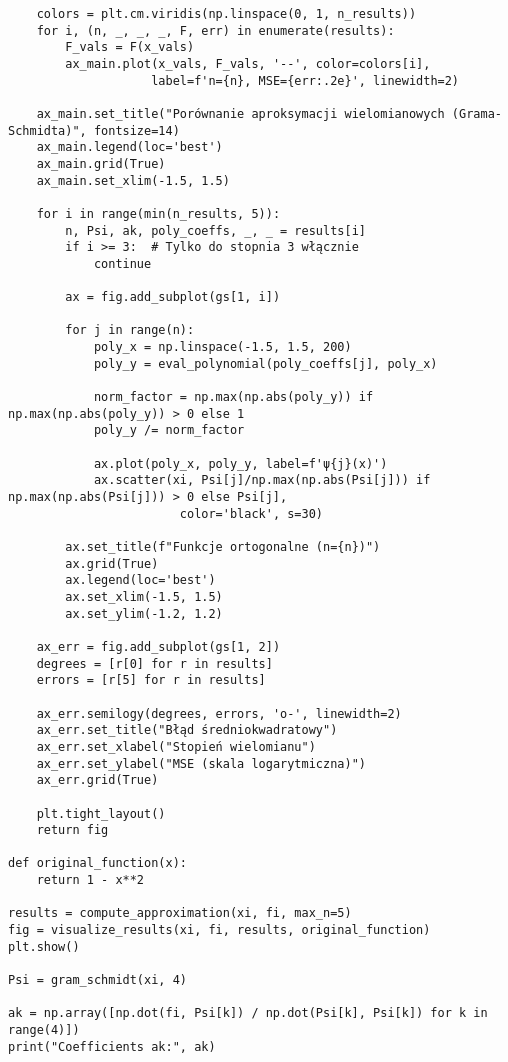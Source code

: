 \documentclass{article}
\begin{document}
\begin{verbatim}
    colors = plt.cm.viridis(np.linspace(0, 1, n_results))
    for i, (n, _, _, _, F, err) in enumerate(results):
        F_vals = F(x_vals)
        ax_main.plot(x_vals, F_vals, '--', color=colors[i], 
                    label=f'n={n}, MSE={err:.2e}', linewidth=2)
    
    ax_main.set_title("Porównanie aproksymacji wielomianowych (Grama-Schmidta)", fontsize=14)
    ax_main.legend(loc='best')
    ax_main.grid(True)
    ax_main.set_xlim(-1.5, 1.5)
    
    for i in range(min(n_results, 5)):
        n, Psi, ak, poly_coeffs, _, _ = results[i]
        if i >= 3:  # Tylko do stopnia 3 włącznie
            continue
            
        ax = fig.add_subplot(gs[1, i])
        
        for j in range(n):
            poly_x = np.linspace(-1.5, 1.5, 200)
            poly_y = eval_polynomial(poly_coeffs[j], poly_x)
            
            norm_factor = np.max(np.abs(poly_y)) if np.max(np.abs(poly_y)) > 0 else 1
            poly_y /= norm_factor
            
            ax.plot(poly_x, poly_y, label=f'ψ{j}(x)')
            ax.scatter(xi, Psi[j]/np.max(np.abs(Psi[j])) if np.max(np.abs(Psi[j])) > 0 else Psi[j], 
                        color='black', s=30)
        
        ax.set_title(f"Funkcje ortogonalne (n={n})")
        ax.grid(True)
        ax.legend(loc='best')
        ax.set_xlim(-1.5, 1.5)
        ax.set_ylim(-1.2, 1.2)
    
    ax_err = fig.add_subplot(gs[1, 2])
    degrees = [r[0] for r in results]
    errors = [r[5] for r in results]
    
    ax_err.semilogy(degrees, errors, 'o-', linewidth=2)
    ax_err.set_title("Błąd średniokwadratowy")
    ax_err.set_xlabel("Stopień wielomianu")
    ax_err.set_ylabel("MSE (skala logarytmiczna)")
    ax_err.grid(True)
    
    plt.tight_layout()
    return fig

def original_function(x):
    return 1 - x**2
    
results = compute_approximation(xi, fi, max_n=5)
fig = visualize_results(xi, fi, results, original_function)
plt.show()

Psi = gram_schmidt(xi, 4)

ak = np.array([np.dot(fi, Psi[k]) / np.dot(Psi[k], Psi[k]) for k in range(4)])
print("Coefficients ak:", ak)


\end{verbatim}
\end{document}
